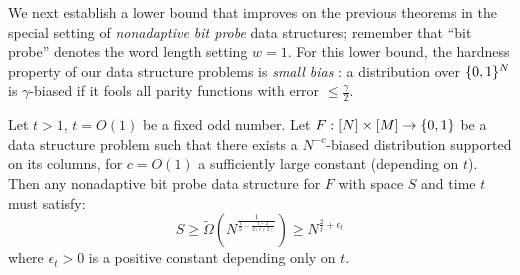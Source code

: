 We next establish a lower bound that improves on the previous theorems in the special setting of \emph{nonadaptive bit probe} data structures; remember that ``bit probe'' denotes the word length setting $w= 1$. For this lower bound, the hardness property of our data structure problems is \emph{small bias} \cite{naornaor}: a distribution over $\{0,1\}^N$ is $\gamma$-biased if it fools all parity functions with error $\leq \frac{\gamma}{2}$.
\begin{theorem}

Let $t>1$, $t = O(1)$ be a fixed odd number.  Let $F:[N] \times [M] \to \{0,1\}$ be a data structure problem such that there exists a $N^{-c}$-biased distribution supported on its columns, for $c=O(1)$ a sufficiently large constant (depending on $t$). Then any nonadaptive bit probe data structure for $F$ with space $S$ and time $t$ must satisfy:
\[
S \geq \tilde{\Omega}(N^{\frac{1}{\frac{t}{2} -\frac{t- 2}{2(t+2)}}})  \geq N^{\frac{2}{t} + \epsilon_t}
\]
where $\epsilon_t > 0$ is a positive constant depending only on $t$.
\end{theorem}


